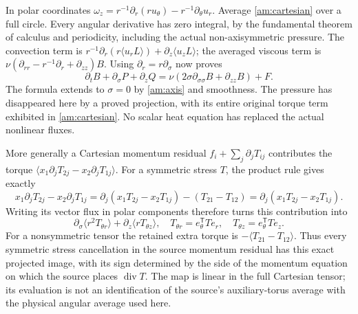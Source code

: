 In polar coordinates
$\omega_z=r^{-1}\partial_r(ru_\theta)
                  -r^{-1}\partial_\theta u_r$.
Average \eqref{am:cartesian} over a full circle. Every angular
derivative has zero integral, by the fundamental theorem of calculus
and periodicity, including the actual non-axisymmetric pressure.
The convection term is
$r^{-1}\partial_r(r\langle u_rL\rangle)
 +\partial_z\langle u_zL\rangle$; the averaged viscous term is
$\nu(\partial_{rr}-r^{-1}\partial_r+\partial_{zz})B$.
Using $\partial_r=r\partial_\sigma$ now proves
\begin{equation}
 \partial_tB+\partial_\sigma P+\partial_zQ
   =\nu(2\sigma\partial_{\sigma\sigma}B+\partial_{zz}B)+F.
 \label{am:pde}
\end{equation}
The formula extends to $\sigma=0$ by \eqref{am:axis} and smoothness.
The pressure has disappeared here by a proved projection, with its
entire original torque term exhibited in \eqref{am:cartesian}.
No scalar heat equation has replaced the actual nonlinear fluxes.

More generally a Cartesian momentum residual
$f_i+\sum_j\partial_jT_{ij}$ contributes the torque
$\langle x_1\partial_jT_{2j}-x_2\partial_jT_{1j}\rangle$.
For a symmetric stress $T$, the product rule gives exactly
\[
 x_1\partial_jT_{2j}-x_2\partial_jT_{1j}
  =\partial_j(x_1T_{2j}-x_2T_{1j})-(T_{21}-T_{12})
  =\partial_j(x_1T_{2j}-x_2T_{1j}).
\]
Writing its vector flux in polar components therefore turns this
contribution into
\begin{equation}
 \partial_\sigma\langle r^2 T_{\theta r}\rangle
       +\partial_z\langle r T_{\theta z}\rangle,
 \quad T_{\theta r}=e_\theta^{\mathsf T}Te_r,
 \quad T_{\theta z}=e_\theta^{\mathsf T}Te_z.
 \label{am:stressmap}
\end{equation}
For a nonsymmetric tensor the retained extra torque is
$-\langle T_{21}-T_{12}\rangle$. Thus every symmetric stress
cancellation in the source momentum residual has this exact projected
image, with its sign determined by the side of the momentum equation
on which the source places $\operatorname{div}T$.
The map is linear in the full Cartesian tensor; its evaluation is not
an identification of the source's auxiliary-torus average with the
physical angular average used here.

